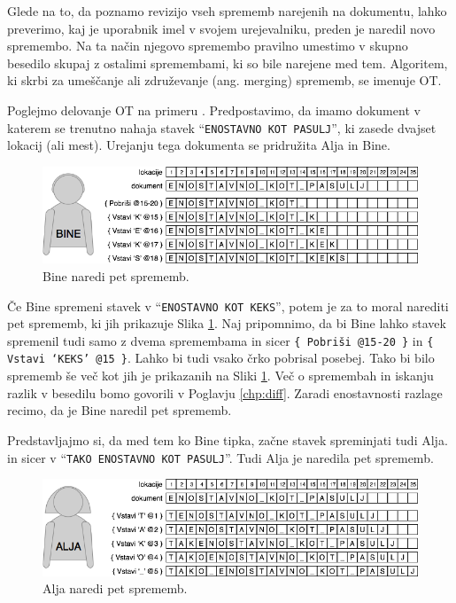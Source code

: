 \documentclass[a4paper, 12pt, twoside]{book}
\begin{document}
Glede na to, da poznamo revizijo vseh sprememb narejenih na dokumentu, lahko preverimo, kaj je uporabnik imel v svojem urejevalniku, preden je naredil novo spremembo. Na ta način njegovo spremembo pravilno umestimo v skupno besedilo skupaj z ostalimi spremembami, ki so bile narejene med tem. Algoritem, ki skrbi za umeščanje ali združevanje (ang. merging) sprememb, se imenuje OT.

Poglejmo delovanje OT na primeru \cite{gdocs22}. Predpostavimo, da imamo dokument v katerem se trenutno nahaja stavek “{\tt ENOSTAVNO KOT PASULJ}”, ki zasede dvajset lokacij (ali mest). Urejanju tega dokumenta se pridružita Alja in Bine.

\begin{figure}[placement h]
\begin{center}
\includegraphics[width=12cm]{ot1.png}
\end{center}
\caption{Bine naredi pet sprememb.}
\label{ot1}
\end{figure}

Če Bine spremeni stavek v “{\tt ENOSTAVNO KOT KEKS}”, potem je za to moral narediti pet sprememb, ki jih prikazuje Slika \ref{ot1}. Naj pripomnimo, da bi Bine lahko stavek spremenil tudi samo z dvema spremembama in sicer {\tt \{ Pobriši @15-20 \}} in {\tt \{ Vstavi ‘KEKS’ @15 \}}. Lahko bi tudi vsako črko pobrisal posebej. Tako bi bilo sprememb še več kot jih je prikazanih na Sliki \ref{ot1}. Več o spremembah in iskanju razlik v besedilu bomo govorili v Poglavju \ref{chp:diff}. Zaradi enostavnosti razlage recimo, da je Bine naredil pet sprememb.

Predstavljajmo si, da med tem ko Bine tipka, začne stavek spreminjati tudi Alja. in sicer v “{\tt TAKO ENOSTAVNO KOT PASULJ}”. Tudi Alja je naredila pet sprememb.

\begin{figure}[placement h]
\begin{center}
\includegraphics[width=12cm]{ot2.png}
\end{center}
\caption{Alja naredi pet sprememb.}
\label{ot2}
\end{figure}
\end{document}
